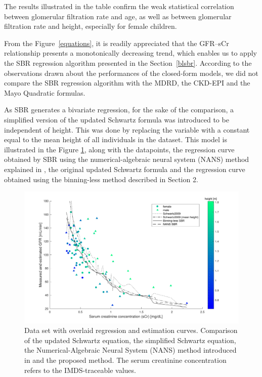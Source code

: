 \documentclass[10pt,final]{siamltex}
\begin{document}
%
The results illustrated in the table confirm the weak statistical correlation between glomerular filtration rate and age, as well as between glomerular filtration rate and height, especially for female children.

From the Figure~\ref{equations}, it is readily appreciated that the GFR--sCr relationship presents a monotonically decreasing trend, which enables us to apply the SBR regression algorithm presented in the Section~\ref{blsbr}. According to the observations drawn about the performances of the closed-form models, we did not compare the SBR regression algorithm with the MDRD, the CKD-EPI and the Mayo Quadratic formulas.

As SBR generates a bivariate regression, for the sake of the comparison, a simplified version of the updated Schwartz formula was introduced to be independent of height. This was done by replacing the variable with a constant equal to the mean height of all individuals in the dataset. This model is illustrated in the Figure \ref{regression}, along with the datapoints, the regression curve obtained by SBR using the numerical-algebraic neural system (NANS) method explained in \cite{fiori}, the original updated Schwartz formula and the regression curve obtained using the binning-less method described in Section 2.
%
\begin{figure}[ht]
  \centering
  \includegraphics[scale=0.6]{figures/regression}
  \caption{Data set with overlaid regression and estimation curves. Comparison of the updated Schwartz equation, the simplified Schwartz equation, the Numerical-Algebraic Neural System (NANS) method introduced in \cite{fiori} and the proposed method. The serum creatinine concentration refers to the IMDS-traceable values.}
  \label{regression}
\end{figure}
%
\end{document}
